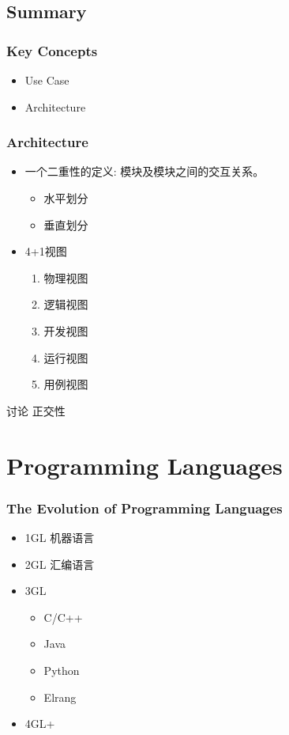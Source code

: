 \subsection{Summary}
\begin{frame}
  \frametitle{Key Concepts}
  \begin{itemize}
    \item Use Case
    \item Architecture
  \end{itemize}
\end{frame}

\begin{frame}
  \frametitle{Architecture}
  \begin{itemize}
    \item 一个二重性的定义: 模块及模块之间的交互关系。
      \begin{itemize}
        \item 水平划分
        \item 垂直划分
      \end{itemize}
    \item 4+1视图
      \begin{enumerate}
        \item 物理视图
        \item 逻辑视图
        \item 开发视图
        \item 运行视图
        \item \alert{用例视图}
      \end{enumerate}
  \end{itemize}
  \begin{block}{讨论}
    \alert{正交性}
  \end{block}
\end{frame}


\section{Programming Languages}
\begin{frame}
\frametitle{The Evolution of Programming Languages}
\begin{itemize}
  \item 1GL 机器语言
  \item 2GL 汇编语言
  \item \alert{3GL}
    \begin{itemize}
      \item C/C++
      \item Java
      \item Python
      \item Elrang
    \end{itemize}
  \item 4GL+
\end{itemize}
\end{frame}

